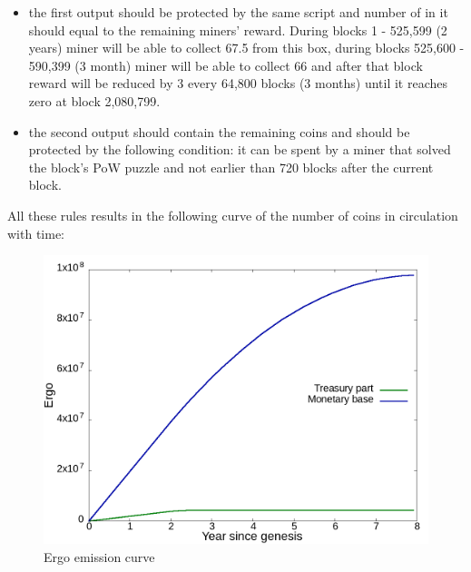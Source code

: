 \begin{itemize}
    \begin{itemize}
    \item{} the first output should be protected by the same script and number of \Erg{} in it should
    equal to the remaining miners' reward.
    During blocks 1 - 525,599 (2 years) miner will be able to collect 67.5 \Erg{} from this box,
    during blocks 525,600 - 590,399 (3 month) miner will be able to collect 66 \Erg{} and after
    that block reward will be reduced by 3 \Erg{} every 64,800 blocks (3 months) until it reaches zero
    at block 2,080,799.

    \item{} the second output should contain the remaining coins and should be protected by the following condition:
    it can be spent by a miner that solved the block's PoW puzzle and not earlier than 720 blocks after the current block.
    \end{itemize}

\end{itemize}

All these rules results in the following curve of the number of coins in circulation with time:

\begin{figure}[H]
    \centering
    \includegraphics[width=\textwidth]{img/emission.png}
    \caption{Ergo emission curve
    \label{fig:emission} }
\end{figure}

